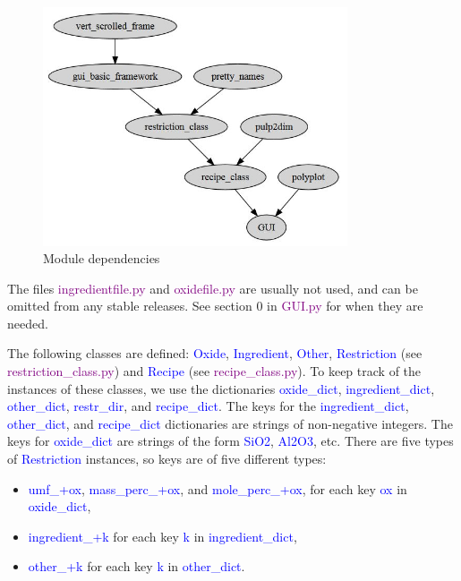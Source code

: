 \documentclass[a4paper,10pt]{article}
\def\'{\textquotesingle}
\def\blue{\textcolor{blue}}
\def\green{\textcolor{Purple}}
\begin{document}

\begin{figure}[ht!]
\centering
\includegraphics[width=90mm]{Module_dependencies.jpg}
\caption{Module dependencies \label{dep}}
\end{figure}

The files \green{ingredientfile.py} and \green{oxidefile.py} are usually not used, and can be omitted from any stable releases. See section 0 in \green{GUI.py} for when they are needed.

The following classes are defined: \blue{Oxide}, \blue{Ingredient}, \blue{Other}, \blue{Restriction} (see \green{restriction\_class.py}) and \blue{Recipe} (see \green{recipe\_class.py}). To keep track of the instances of these classes, we use the dictionaries \blue{oxide\_dict}, \blue{ingredient\_dict}, \blue{other\_dict}, \blue{restr\_dir}, and \blue{recipe\_dict}. The keys for the \blue{ingredient\_dict}, \newline \blue{other\_dict}, and \blue{recipe\_dict} dictionaries are strings of non-negative integers. The keys for \blue{oxide\_dict} are strings of the form \blue{\'SiO2\'}, \blue{\'Al2O3\'}, etc.  There are five types of \blue{Restriction} instances, so keys are of five different types:
\begin{itemize}
\item \blue{\'umf\_\'+ox}, \blue{\'mass\_perc\_\'+ox}, and \blue{\'mole\_perc\_\'+ox}, for each key \blue{ox} in \blue{oxide\_dict},
\item \blue{\'ingredient\_\'+k} for each key \blue{k} in \blue{ingredient\_dict}, 
\item \blue{\'other\_\'+k} for each key \blue{k} in \blue{other\_dict}. 
\end{itemize}
\end{document}
